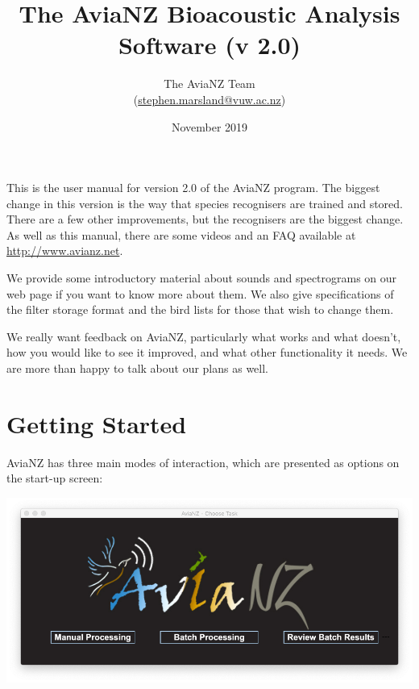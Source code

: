 \documentclass{article}
\title{The AviaNZ Bioacoustic Analysis Software (v 2.0)}
\author{The AviaNZ Team \\(\url{stephen.marsland@vuw.ac.nz})}
\date{November 2019}
\begin{document}
\maketitle

This is the user manual for version 2.0 of the AviaNZ program. The biggest change in this version is the way that species recognisers are trained and stored. There are a few other improvements, but the recognisers are the biggest change.
As well as this manual, there are some videos and an FAQ available at \url{http://www.avianz.net}.

We provide some introductory material about sounds and spectrograms on our web page if you want to know more about them. We also give specifications of the filter storage format and the bird lists for those that wish to change them. 
 
We really want feedback on AviaNZ, particularly what works and what doesn't, how you would like to see it improved, and what other functionality it needs. We are more than happy to talk about our plans as well. 


\tableofcontents

\newpage
\section{Getting Started}


AviaNZ has three main modes of interaction, which are presented as options on the start-up screen:

\begin{center}
\includegraphics[width=.3\textwidth]{Figs/splashscreen}
\end{center}
\end{document}

